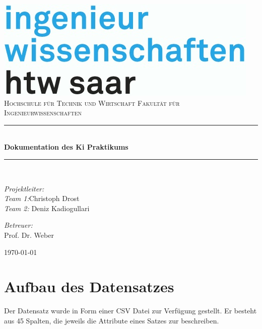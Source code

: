 \documentclass[12pt, a4paper, ngerman]{article}
\begin{document}
\begin{titlepage}
		\begin{center}
			\includegraphics[width=.8\linewidth]{Grafiken/logo_htw.jpg}\\[1cm]    
			\textsc{\LARGE Hochschule für Technik und Wirtschaft \newline Fakultät für Ingenieurwissenschaften}\\[1.5cm]
			\newcommand{\HRule}{\rule{\linewidth}{0.5mm}} \HRule \\[0.4cm] { \huge \bfseries Dokumentation des Ki Praktikums}\\[0.4cm]
			\HRule \\[1.5cm]

			\begin{minipage}{0.4\textwidth}
				\begin{flushleft} \large
					\emph{Projektleiter:} \\
					\emph{Team 1:}Christoph Drost\\
					\emph{Team 2:} Deniz Kadiogullari
					\end{flushleft}
			\end{minipage}
			\hfill
			\begin{minipage}{0.4\textwidth}
				\begin{flushright} \large
					\emph{Betreuer:} \\
					Prof. Dr. Weber \\
				\end{flushright}
			\end{minipage}
			\vfill
			{\large \today}
		\end{center}
	\end{titlepage}


\tableofcontents
\newpage 

\section{Aufbau des Datensatzes}

Der Datensatz wurde in Form einer CSV Datei zur Verfügung gestellt. Er besteht aus 45 Spalten, die jeweils die Attribute eines Satzes zur beschreiben. \\ \\
\end{document}
